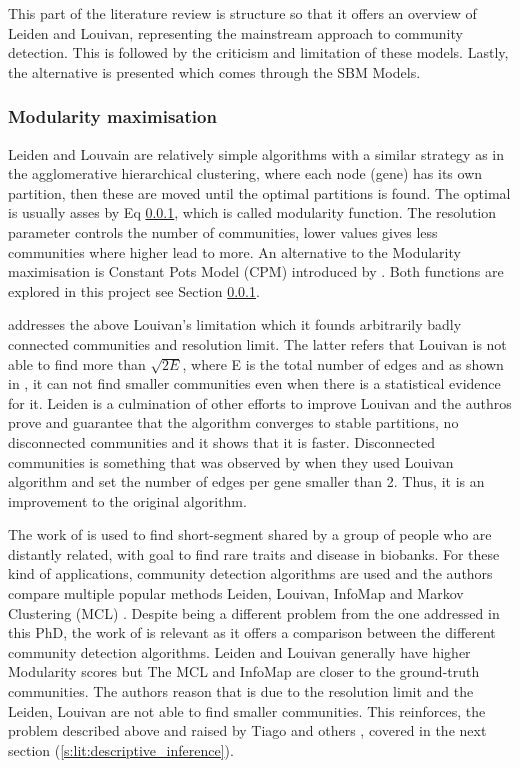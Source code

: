 This part of the literature review is structure so that it offers an overview of Leiden and Louivan, representing the mainstream approach to community detection. This is followed by the criticism and limitation of these models. Lastly, the alternative is presented which comes through the SBM Models.


\subsubsection{Modularity maximisation}

Leiden and Louvain \citet{Traag2019-ne,Blondel2008-ik} are relatively simple algorithms with a similar strategy as in the agglomerative hierarchical clustering, where each node (gene) has its own partition, then these are moved until the optimal partitions is found. The optimal is usually asses by Eq \ref{}, which is called modularity function. The resolution parameter controls the number of communities, lower values gives less communities where higher lead to more. An alternative to the Modularity maximisation is Constant Pots Model (CPM) introduced by \citet{Traag2011-if}. Both functions are explored in this project see Section \ref{}.

\citet{Traag2019-ne} addresses the above Louivan's limitation  which it founds arbitrarily badly connected communities and resolution limit. The latter refers that Louivan is not able to find more than $\sqrt{2E}$, where E is the total number of edges and as shown in \citet{Peixoto2021-jx}, it can not find smaller communities even when there is a statistical evidence for it. Leiden is a culmination of other efforts to improve Louivan\cite{Ozaki2016-dl,Waltman2013-zw,Bae2017-rz, Traag2015-tq} and the authros prove and guarantee that the algorithm converges to stable partitions, no disconnected communities and it shows that it is faster. Disconnected communities is something that was observed by \citet{Care2019-ij} when they used Louivan algorithm and set the number of edges per gene smaller than 2. Thus, it is an improvement to the original algorithm.

The work of \citet{Shemirani2023-ww} is used to find short-segment shared by a group of people who are distantly related, with goal to find rare traits and disease in biobanks. For these kind of applications, community detection algorithms are used and the authors compare multiple popular methods Leiden, Louivan, InfoMap \citet{Rosvall2008-kw} and Markov Clustering (MCL) \citet{Van_Dongen2008-yj}. Despite being a different problem from the one addressed in this PhD, the work of \citet{Shemirani2023-ww} is relevant as it offers a comparison between the different community detection algorithms. Leiden and Louivan generally have higher Modularity scores but The MCL and InfoMap are closer to the ground-truth communities. The authors reason that is due to the resolution limit and the Leiden, Louivan are not able to find smaller communities. This reinforces, the problem described above and raised by Tiago \citet{Peixoto2021-jx} and others \cite{Fortunato2007-gh, Traag2019-ne}, covered in the next section (\ref{s:lit:descriptive_inference}).

